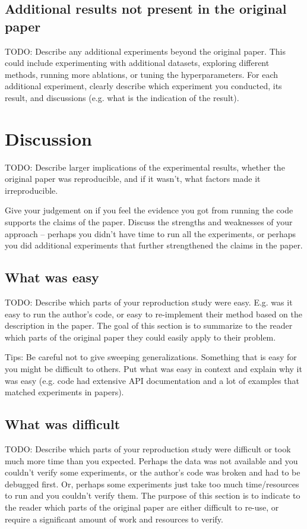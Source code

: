 \documentclass[11pt,a4paper]{article}
\begin{document}
\subsection{Additional results not present in the original paper}
TODO: 
Describe any additional experiments beyond the original paper. This could include experimenting with additional datasets, exploring different methods, running more ablations, or tuning the hyperparameters. For each additional experiment, clearly describe which experiment you conducted, its result, and discussions (e.g. what is the indication of the result).

\section{Discussion}
TODO: 
Describe larger implications of the experimental results, whether the original paper was reproducible, and if it wasn’t, what factors made it irreproducible. 

Give your judgement on if you feel the evidence you got from running the code supports the claims of the paper. Discuss the strengths and weaknesses of your approach -- perhaps you didn't have time to run all the experiments, or perhaps you did additional experiments that further strengthened the claims in the paper.

\subsection{What was easy}
TODO: 
Describe which parts of your reproduction study were easy. E.g. was it easy to run the author's code, or easy to re-implement their method based on the description in the paper. The goal of this section is to summarize to the reader which parts of the original paper they could easily apply to their problem. 

Tips: Be careful not to give sweeping generalizations. Something that is easy for you might be difficult to others. Put what was easy in context and explain why it was easy (e.g. code had extensive API documentation and a lot of examples that matched experiments in papers). 

\subsection{What was difficult}
TODO: 
Describe which parts of your reproduction study were difficult or took much more time than you expected. Perhaps the data was not available and you couldn't verify some experiments, or the author's code was broken and had to be debugged first. Or, perhaps some experiments just take too much time/resources to run and you couldn't verify them. The purpose of this section is to indicate to the reader which parts of the original paper are either difficult to re-use, or require a significant amount of work and resources to verify. 
\end{document}

